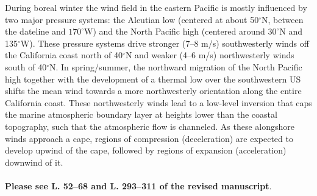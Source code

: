 \documentclass{article}
\begin{document}
\begin{enumerate}
\begin{enumerate}
{\color{blue} 
During boreal winter the wind field in the eastern Pacific is mostly influenced by two major pressure systems: the Aleutian low (centered at about 50$^\circ$N, between the dateline and $170^\circ$W) and the North Pacific high (centered around $30^\circ$N and 135$^\circ$W). These pressure systems drive stronger (7--8 m/s) southwesterly winds off the California coast north of 40$^\circ$N and weaker (4--6 m/s) northwesterly winds south of 40$^\circ$N.
In spring/summer, the northward migration of the North Pacific high together with the development of a thermal low over the southwestern US shifts the mean wind towards a more northwesterly orientation along the entire California coast.
These northwesterly winds lead to a low-level inversion that caps the marine atmospheric boundary layer at heights lower than the coastal topography, such that the atmospheric flow is channeled. As these alongshore winds approach a cape, regions of compression (deceleration) are expected to develop upwind of the cape, followed by regions of expansion (acceleration) downwind of it.
\\\\
\textbf{Please see L. 52--68 and L. 293--311 of the revised manuscript}.}


\end{enumerate}



\end{enumerate}



\end{document}
